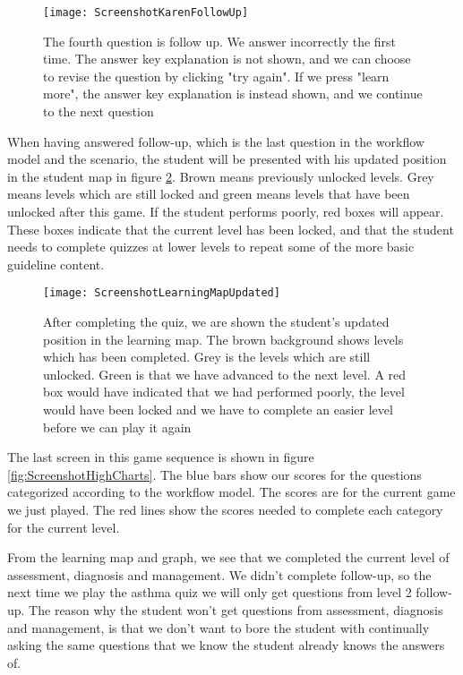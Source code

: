 \begin{figure}[h!]
	\texttt{[image: ScreenshotKarenFollowUp]}
	\caption {The fourth question is follow up. We answer incorrectly the first time. The answer key explanation is not shown, and we can choose to revise the question by clicking "try again". If we press "learn more", the answer key explanation is instead shown, and we continue to the next question}
	\label{fig:ScreenshotKarenFollowUp}
\end{figure}

When having answered follow-up, which is the last question in the workflow model and the scenario, the student will be presented with his updated position in the student map in figure \ref{fig:ScreenshotLearningMapUpdated}. Brown means previously unlocked levels. Grey means levels which are still locked and green means levels that have been unlocked after this game. If the student performs poorly, red boxes will appear. These boxes indicate that the current level has been locked, and that the student needs to complete quizzes at lower levels to repeat some of the more basic guideline content.

\begin{figure}[h!]
	\texttt{[image: ScreenshotLearningMapUpdated]}
	\caption {After completing the quiz, we are shown the student's updated position in the learning map. The brown background shows levels which has been completed. Grey is the levels which are still unlocked. Green is that we have advanced to the next level. A red box would have indicated that we had performed poorly, the level would have been locked and we have to complete an easier level before we can play it again}
	\label{fig:ScreenshotLearningMapUpdated}
\end{figure}

The last screen in this game sequence is shown in figure \ref{fig:ScreenshotHighCharts}. The blue bars show our scores for the questions categorized according to the workflow model. The scores are for the current game we just played. The red lines show the scores needed to complete each category for the current level.

From the learning map and graph, we see that we completed the current level of assessment, diagnosis and management. We didn't complete follow-up, so the next time we play the asthma quiz we will only get questions from level 2 follow-up. The reason why the student won't get questions from assessment, diagnosis and management, is that we don't want to bore the student with continually asking the same questions that we know the student already knows the answers of.

